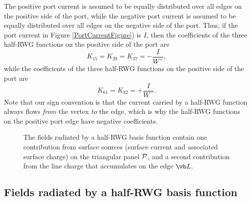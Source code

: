 \documentclass[letterpaper]{article}
\begin{document}
The positive port current is assumed to be equally distributed over 
all edges on the positive side of the port, while the 
negative port current is assumed to be equally distributed over 
all edges on the negative side of the port.
Thus, if the port current in Figure \ref{PortCurrentFigure}) is $I$, 
then the coefficients of the three half-RWG functions on the 
positive side of the port are
$$K_{15}=K_{29}=K_{37}=-\frac{I}{W^+},$$
while the coefficients of the three half-RWG functions on the 
positive side of the port are
$$K_{61}=K_{82}=+\frac{I}{W^-}.$$
Note that our sign convention is that the current carried
by a half-RWG function always flows \textit{from} the vertex 
\textit{to} the edge, which is why the half-RWG functions
on the positive port edge have negative coefficients.

\begin{figure}
\begin{center}
\caption{The fields radiated by a half-RWG basis function
         contain one contribution from surface sources 
         (surface current and associated surface charge)
         on the triangular panel $\mathcal{P}$, and a second contribution
         from the line charge that accumulates on the edge 
         $\vb L.$
        }
\label{HalfRWGBasisFunction}
\end{center}
\end{figure}

\subsection*{Fields radiated by a half-RWG basis function}
\end{document}
